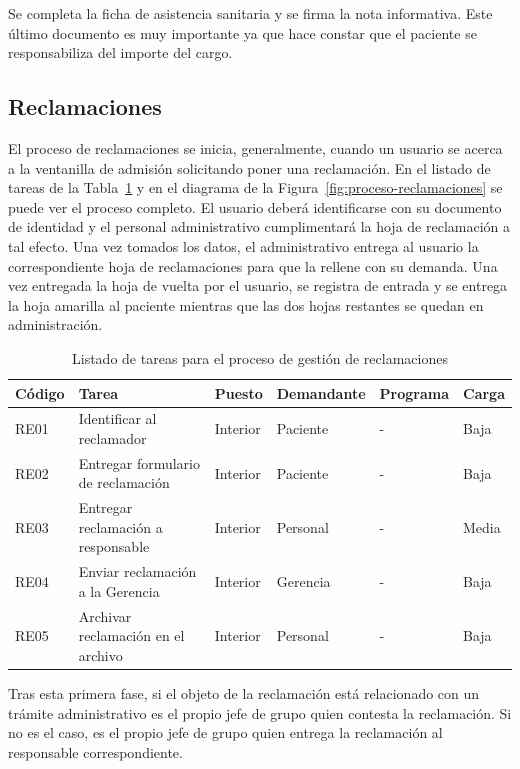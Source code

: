 Se completa la ficha de asistencia sanitaria y se firma la nota informativa.
Este último documento es muy importante ya que hace constar que el paciente se responsabiliza del importe del cargo.

\subsection{Reclamaciones}

El proceso de reclamaciones se inicia, generalmente, cuando un usuario se acerca a la ventanilla de admisión solicitando poner una reclamación.
En el listado de tareas de la Tabla~\ref{tab:proceso-reclamaciones} y en el diagrama de la Figura~\ref{fig:proceso-reclamaciones} se puede ver el proceso completo.
El usuario deberá identificarse con su documento de identidad y el personal administrativo cumplimentará la hoja de reclamación a tal efecto.
Una vez tomados los datos, el administrativo entrega al usuario la correspondiente hoja de reclamaciones para que la rellene con su demanda.
Una vez entregada la hoja de vuelta por el usuario, se registra de entrada y se entrega la hoja amarilla al paciente mientras que las dos hojas restantes se quedan en administración.

\begin{table}[H]
    \centering
    \begin{tabular}{lp{5cm}llll}
        \toprule
        Código & Tarea                              & Puesto   & Demandante & Programa & Carga \\
        \midrule
        RE01   & Identificar al reclamador          & Interior & Paciente   & -        & Baja  \\
        RE02   & Entregar formulario de reclamación & Interior & Paciente   & -        & Baja  \\
        RE03   & Entregar reclamación a responsable & Interior & Personal   & -        & Media \\
        RE04   & Enviar reclamación a la Gerencia   & Interior & Gerencia   & -        & Baja  \\
        RE05   & Archivar reclamación en el archivo & Interior & Personal   & -        & Baja  \\
        \bottomrule
    \end{tabular}
    \caption{Listado de tareas para el proceso de gestión de reclamaciones}
    \label{tab:proceso-reclamaciones}
\end{table}

Tras esta primera fase, si el objeto de la reclamación está relacionado con un trámite administrativo es el propio jefe de grupo quien contesta la reclamación.
Si no es el caso, es el propio jefe de grupo quien entrega la reclamación al responsable correspondiente.

